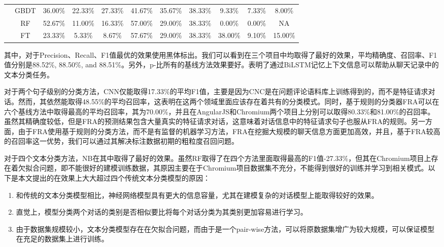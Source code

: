 \begin{table}
\begin{tabular}{|c|c|c|c|c|c|c|c|c|c|c|}
                                     & GBDT      & 36.00\%          & 22.33\%          & 27.33\%          & 41.67\%          & 35.67\%          & 38.33\%          & 9.33\%           & 7.33\%           & 8.00\%           \\ \cline{2-11} 
                                     & RF        & 52.67\%          & 11.00\%          & 16.33\%          & 57.00\%          & 29.00\%          & 38.33\%          & 0.00\%           & 0.00\%           & NA               \\ \cline{2-11} 
                                     & FT        & 23.33\%          & 5.33\%           & 8.67\%           & 57.67\%          & 29.00\%          & 38.33\%          & 38.00\%          & 9.10\%           & 15.00\%          \\ \hline
\end{tabular}
\end{table}

其中，对于Precision、Recall、F1值最优的效果使用黑体标出。我们可以看到{\tool}在三个项目中均取得了最好的效果，平均精确度、召回率、F1值分别是88.52\%, 88.50\%, and 88.51\%。另外，p-{\tool}比所有的基线方法效果要好。表明了通过BiLSTM记忆上下文信息可以帮助从聊天记录中的文本分类任务。

对于两个句子级别的分类方法，CNN仅能取得17.33\%的平均F1值，主要是因为CNC是在问题评论语料库上训练得到的，而不是特征请求对话。然而，其依然能取得48.55\%的平均召回率，这表明在这两个领域里面应该存在着共有的分类模式。同时，基于规则的分类器FRA可以在六个基线方法中取得最高的平均召回率，其为70.00\%，并且在AngularJS和Chromium两个项目上分别可以取得80.33\%和81.00\%的召回率。虽然其精确度较低，但是FRA的预测结果包含大量真实的特征请求对话，这意味着对话信息中的特征请求句子也服从FRA的规则。另一方面，由于FRA使用基于规则的分类方法，而不是有监督的机器学习方法，FRA在挖掘大规模的聊天信息方面更加高效，并且，基于FRA较高的召回率这一优势，我们可以通过其解决标注数据初期的粗粒度召回问题。

对于四个文本分类方法，NB在其中取得了最好的效果。虽然RF取得了在四个方法里面取得最高的F1值-27.33\%，但其在Chromium项目上存在着欠拟合问题，即不能很好的建模训练数据，其原因主要在于Chromium项目数据集不充分，不能得到很好的训练并学习到相关模式。以下是本文提出的{\tool}在效果上大大超过四个传统文本分类模型的原因：
\begin{enumerate}
    \item 和传统的文本分类模型相比，神经网络模型具有更大的信息容量，尤其在建模复杂的对话模型上能取得较好的效果。
    \item 直觉上，模型分类两个对话的类别是否相似要比将每个对话分类为其类别更加容易进行学习。
    \item 由于数据集规模较小，文本分类模型存在在欠拟合问题，而由于{\tool}是一个pair-wise方法，可以将原数据集增广为较大规模，可以保证模型在充足的数据集上进行训练。
\end{enumerate}

